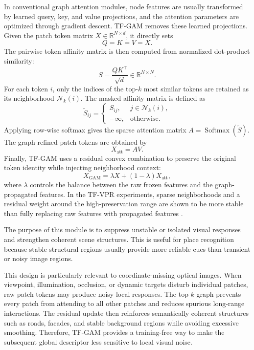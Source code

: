 In conventional graph attention modules, node features are usually transformed by learned query, key, and value projections, and the attention parameters are optimized through gradient descent. TF-GAM removes these learned projections. Given the patch token matrix \(X \in \mathbb{R}^{N \times d}\), it directly sets
\begin{equation}
  Q = K = V = X.
\end{equation}
The pairwise token affinity matrix is then computed from normalized dot-product similarity:
\begin{equation}
  S = \frac{QK^{\top}}{\sqrt{d}} \in \mathbb{R}^{N \times N}.
\end{equation}
For each token \(i\), only the indices of the top-\(k\) most similar tokens are retained as its neighborhood \(\mathcal{N}_{k}(i)\). The masked affinity matrix is defined as
\begin{equation}
  \tilde{S}_{ij} =
  \begin{cases}
    S_{ij}, & j \in \mathcal{N}_{k}(i),\\
    -\infty, & \text{otherwise}.
  \end{cases}
\end{equation}
Applying row-wise softmax gives the sparse attention matrix \(A=\operatorname{Softmax}(\tilde{S})\). The graph-refined patch tokens are obtained by
\begin{equation}
  X_{\mathrm{att}} = AV.
\end{equation}
Finally, TF-GAM uses a residual convex combination to preserve the original token identity while injecting neighborhood context:
\begin{equation}
  X_{\mathrm{GAM}} = \lambda X + (1-\lambda)X_{\mathrm{att}},
\end{equation}
where \(\lambda\) controls the balance between the raw frozen features and the graph-propagated features. In the TF-VPR experiments, sparse neighborhoods and a residual weight around the high-preservation range are shown to be more stable than fully replacing raw features with propagated features \cite{wang2026tfvpr}.

The purpose of this module is to suppress unstable or isolated visual responses and strengthen coherent scene structures. This is useful for place recognition because stable structural regions usually provide more reliable cues than transient or noisy image regions.

This design is particularly relevant to coordinate-missing optical images. When viewpoint, illumination, occlusion, or dynamic targets disturb individual patches, raw patch tokens may produce noisy local responses. The top-\(k\) graph prevents every patch from attending to all other patches and reduces spurious long-range interactions. The residual update then reinforces semantically coherent structures such as roads, facades, and stable background regions while avoiding excessive smoothing. Therefore, TF-GAM provides a training-free way to make the subsequent global descriptor less sensitive to local visual noise.

